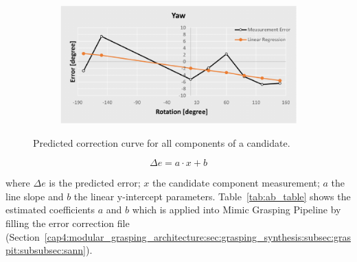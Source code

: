 \begin{figure}[h!]
{\begin{tcolorbox}
\begin{subfigure}[c]{.485\textwidth}
     \end{subfigure}
     \hfill
     \begin{subfigure}[c]{.485\textwidth}
         \centering
         \includegraphics[width=1\textwidth]{Cap5/Figuras/yaw_correction_asses.pdf}
     \end{subfigure}
    \end{tcolorbox}
    \caption{Predicted correction curve for all components of a candidate.}
    \label{fig:mimic_grapsing_linear_regression_angular}
  }%
\end{figure}

\begin{equation}
   \Delta e = a\cdot x + b 
   \label{eq:linear_eq}
\end{equation}

where $\Delta e$ is the predicted error; $x$ the candidate component measurement; $a$ the line slope and $b$ the linear y-intercept parameters. Table~\ref{tab:ab_table} shows the estimated coefficients $a$ and $b$ which is applied into Mimic Grasping Pipeline by filling the error correction file (Section~\ref{cap4:modular_grasping_architecture:sec:grasping_synthesis:subsec:graspit:subsubsec:sann}).

